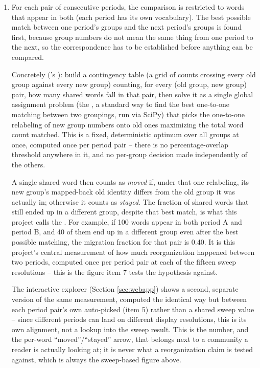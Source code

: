 \documentclass[11pt]{article}
\begin{document}
\begin{enumerate}
  \item {} For each pair of
    consecutive periods, the comparison is restricted to words that
    appear in both (each period has its own vocabulary). The best
    possible match between one period's groups and the next period's
    groups is found first, because group numbers do not mean the same
    thing from one period to the next, so the correspondence has to be
    established before anything can be compared.

    Concretely ('s ): build a
    contingency table (a grid of counts crossing every old group against
    every new group) counting, for every (old group, new group) pair,
    how many shared words fall in that pair, then solve it as a single
    global assignment problem (the , a standard
    way to find the best one-to-one matching between two groupings, run
    via SciPy) that picks the one-to-one relabeling of new group numbers
    onto old ones maximizing the total word count matched. This is a
    fixed, deterministic optimum over all groups at once, computed once
    per period pair -- there is no percentage-overlap threshold anywhere
    in it, and no per-group decision made independently of the others.

    A single shared word then counts as \emph{moved} if, under that one
    relabeling, its new group's mapped-back old identity differs from
    the old group it was actually in; otherwise it counts as
    \emph{stayed}. The fraction of shared words that still ended up in a
    different group, despite that best match, is what this project calls
    the . For example, if 100 words appear in
    both period A and period B, and 40 of them end up in a different
    group even after the best possible matching, the migration fraction
    for that pair is 0.40. It is this project's central measurement of
    how much reorganization happened between two periods, computed once
    per period pair at each of the fifteen sweep resolutions -- this is
    the figure item 7 tests the hypothesis against.

    The interactive explorer (Section \ref{sec:webapp}) shows a second,
    separate version of the same measurement, computed the identical
    way but between each period pair's own auto-picked  (item 5) rather than a shared sweep value -- since
    different periods can land on different display resolutions, this
    is its own alignment, not a lookup into the sweep result. This is
    the number, and the per-word ``moved''/``stayed'' arrow, that
    belongs next to a community a reader is actually looking at; it is
    never what a reorganization claim is tested against, which is
    always the sweep-based figure above.


\end{enumerate}
\end{document}
